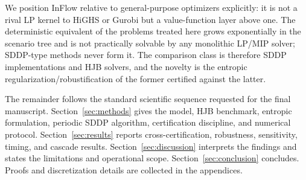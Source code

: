 \documentclass[pdflatex,sn-mathphys-num]{sn-jnl}
\theoremstyle{thmstyleone}
\theoremstyle{thmstyletwo}
\theoremstyle{thmstylethree}
\begin{document}
We position InFlow relative to general-purpose optimizers explicitly:
it is not a rival LP kernel to HiGHS or Gurobi but a value-function layer
above one. The deterministic equivalent of the problems treated here grows
exponentially in the scenario tree and is not practically solvable by any
monolithic LP/MIP solver; SDDP-type methods never form it. The comparison
class is therefore SDDP implementations and HJB solvers, and the novelty
is the entropic regularization/robustification of the former certified
against the latter.

The remainder follows the standard scientific sequence requested for the
final manuscript. Section~\ref{sec:methods} gives the model, HJB benchmark,
entropic formulation, periodic SDDP algorithm, certification discipline, and
numerical protocol. Section~\ref{sec:results} reports cross-certification,
robustness, sensitivity, timing, and cascade results. Section~\ref{sec:discussion}
interprets the findings and states the limitations and operational scope.
Section~\ref{sec:conclusion} concludes. Proofs and discretization details are
collected in the appendices.
\end{document}
